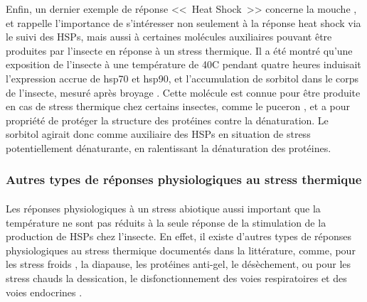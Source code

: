 

		Enfin, un dernier exemple de réponse <<~Heat Shock~>> concerne la mouche , et rappelle l'importance de s'intéresser non seulement à la réponse heat shock via le suivi des HSPs, mais aussi à certaines molécules auxiliaires pouvant être produites par l'insecte en réponse à un stress thermique.
		Il a été montré qu'une exposition de l'insecte à une température de 40\textdegree{}C pendant quatre heures induisait l'expression accrue de hsp70 et hsp90, et l'accumulation de sorbitol dans le corps de l'insecte, mesuré après broyage \cite{salvucci2000}.
		Cette molécule est connue pour être produite en cas de stress thermique chez certains insectes, comme le puceron \cite{hendrix1998}, et a pour propriété de protéger la structure des protéines contre la dénaturation.
		Le sorbitol agirait donc comme auxiliaire des HSPs en situation de stress potentiellement dénaturante, en ralentissant la dénaturation des protéines.

		\subsubsection{Autres types de réponses physiologiques au stress thermique} %

		\paragraph*{}
		Les réponses physiologiques à un stress abiotique aussi important que la température ne sont pas réduits à la seule réponse de la stimulation de la production de HSPs chez l'insecte.
		En effet, il existe d'autres types de réponses physiologiques au stress thermique documentés dans la littérature, comme, pour les stress froids \cite{clark2008}, la diapause, les protéines anti-gel, le désèchement, ou pour les stress chauds la dessication, le disfonctionnement des voies respiratoires et des voies endocrines \cite{neven2000}.

		\paragraph*{}

